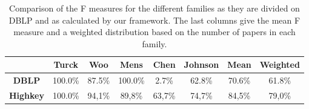 \begin{table}
	\centering
		\begin{tabular}{|c|c|c|c|c|c|c|c|}
			\hline
			& \bfseries{Turck} & \bfseries{Woo} & \bfseries{Mens} & \bfseries{Chen} & \bfseries{Johnson} & \bfseries{Mean} & \bfseries{Weighted} \\
			\hline
			\bfseries{DBLP} & 100.0\% & 87.5\% & 100.0\% & 2.7\% & 62.8\% & 70.6\% & 61.8\% \\
			\hline
			\bfseries{Highkey} & 100.0\% & 94,1\% & 89,8\% & 63,7\% & 74,7\% & 84,5\% & 79,0\% \\
			\hline
		\end{tabular}
	\caption{Comparison of the F measures for the different families as they are divided on DBLP and as calculated by our framework. The last columns give the mean F measure and a weighted distribution based on the number of papers in each family.}
	\label{tab:comparison-dblp}
\end{table}